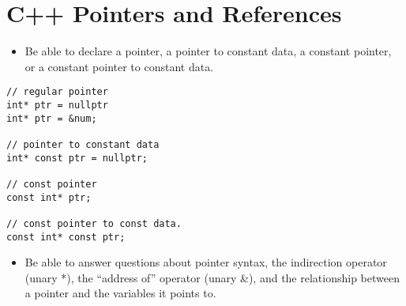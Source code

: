 \documentclass{report}
\begin{document}
\section{C++ Pointers and References}
\begin{itemize}
  \item Be able to declare a pointer, a pointer to constant data, a constant pointer, or a constant pointer to constant data.

\end{itemize}
\begin{mdframed}
\begin{verbatim}
// regular pointer
int* ptr = nullptr
int* ptr = &num;

// pointer to constant data
int* const ptr = nullptr;

// const pointer
const int* ptr;

// const pointer to const data.
const int* const ptr;
\end{verbatim}
\end{mdframed}
\begin{itemize}
  \item Be able to answer questions about pointer syntax, the indirection operator (unary *), the ``address of'' operator (unary \&), and the relationship between a pointer and the variables it points to.
  
\end{itemize}
\end{document}
